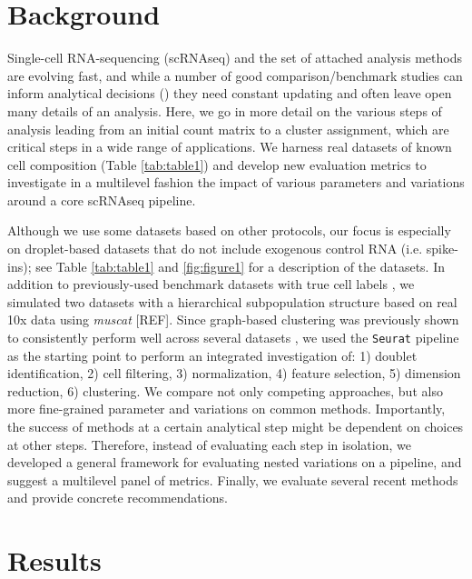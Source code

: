 \documentclass{bmcart}
\begin{document}

\section*{Background}

Single-cell RNA-sequencing (scRNAseq) and the set of attached analysis methods are evolving fast, and while a number of good comparison/benchmark studies can inform analytical decisions (\citealp{duoClustering2018, SonesonDE2018, SunDimRed2019}) they need constant updating and often leave open many details of an analysis. Here, we go in more detail on the various steps of analysis leading from an initial count matrix to a cluster assignment, which are critical steps in a wide range of applications. We harness real datasets of known cell composition (Table \ref{tab:table1}) and develop new evaluation metrics to investigate in a multilevel fashion the impact of various parameters and variations around a core scRNAseq pipeline.

Although we use some datasets based on other protocols, our focus is especially on droplet-based datasets that do not include exogenous control RNA (i.e. spike-ins); see Table \ref{tab:table1} and \ref{fig:figure1} for a description of the datasets. In addition to previously-used benchmark datasets with true cell labels \cite{duoClustering2018,tianMixology2018}, we simulated two datasets with a hierarchical subpopulation structure based on real 10x data using \textit{muscat} [REF]. 
Since graph-based clustering  \cite{satijaSeurat2015} was previously shown to consistently perform well across several datasets \cite{duoClustering2018,tianMixology2018}, we used the \texttt{Seurat} pipeline as the starting point to perform an integrated investigation of: 1) doublet identification, 2) cell filtering, 3) normalization, 4) feature selection, 5) dimension reduction, 6) clustering. We compare not only competing approaches, but also more fine-grained parameter and variations on common methods. Importantly, the success of methods at a certain analytical step might be dependent on choices at other steps. Therefore, instead of evaluating each step in isolation, we developed a general framework for evaluating nested variations on a pipeline, and suggest a multilevel panel of metrics. Finally, we evaluate several recent methods and provide concrete recommendations.

\section*{Results}
\end{document}
